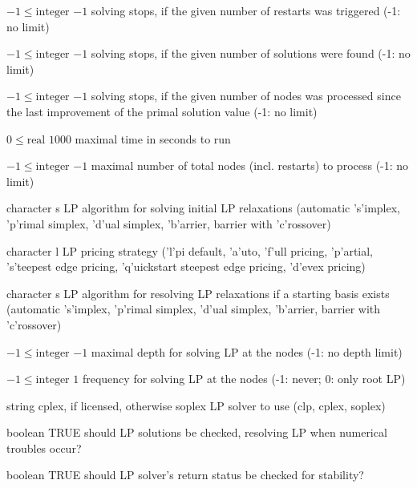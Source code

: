 %
{$-1\leq\textrm{integer}$}%
{$-1$}%
{solving stops, if the given number of restarts was triggered (-1: no limit)}%
{}

%
{$-1\leq\textrm{integer}$}%
{$-1$}%
{solving stops, if the given number of solutions were found (-1: no limit)}%
{}

%
{$-1\leq\textrm{integer}$}%
{$-1$}%
{solving stops, if the given number of nodes was processed since the last improvement of the primal solution value (-1: no limit)}%
{}

%
{$0\leq\textrm{real}$}%
{$1000$}%
{maximal time in seconds to run}%
{}

%
{$-1\leq\textrm{integer}$}%
{$-1$}%
{maximal number of total nodes (incl. restarts) to process (-1: no limit)}%
{}

%
{character}%
{s}%
{LP algorithm for solving initial LP relaxations (automatic 's'implex, 'p'rimal simplex, 'd'ual simplex, 'b'arrier, barrier with 'c'rossover)}%
{}

%
{character}%
{l}%
{LP pricing strategy ('l'pi default, 'a'uto, 'f'ull pricing, 'p'artial, 's'teepest edge pricing, 'q'uickstart steepest edge pricing, 'd'evex pricing)}%
{}

%
{character}%
{s}%
{LP algorithm for resolving LP relaxations if a starting basis exists (automatic 's'implex, 'p'rimal simplex, 'd'ual simplex, 'b'arrier, barrier with 'c'rossover)}%
{}

%
{$-1\leq\textrm{integer}$}%
{$-1$}%
{maximal depth for solving LP at the nodes (-1: no depth limit)}%
{}

%
{$-1\leq\textrm{integer}$}%
{$1$}%
{frequency for solving LP at the nodes (-1: never; 0: only root LP)}%
{}

%
{string}%
{cplex, if licensed, otherwise soplex}%
{LP solver to use (clp, cplex, soplex)}%
{}

%
{boolean}%
{TRUE}%
{should LP solutions be checked, resolving LP when numerical troubles occur?}%
{}

%
{boolean}%
{TRUE}%
{should LP solver's return status be checked for stability?}%
{}

